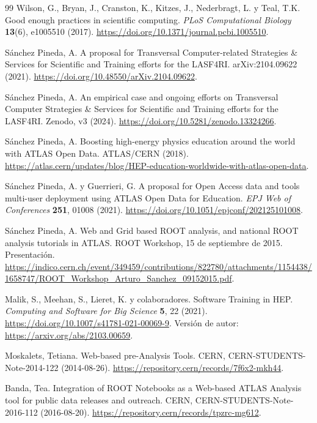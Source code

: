 \begin{thebibliography}{99}\small\setlength{\itemsep}{1pt}\setlength{\parskip}{0pt}
 Wilson, G., Bryan, J., Cranston, K., Kitzes, J., Nederbragt, L. y Teal, T.K. Good enough practices in scientific computing. \emph{PLoS Computational Biology} \textbf{13}(6), e1005510 (2017). \url{https://doi.org/10.1371/journal.pcbi.1005510}.

 Sánchez Pineda, A. A proposal for Transversal Computer-related Strategies \& Services for Scientific and Training efforts for the LASF4RI. arXiv:2104.09622 (2021). \url{https://doi.org/10.48550/arXiv.2104.09622}.

 Sánchez Pineda, A. An empirical case and ongoing efforts on Transversal Computer Strategies \& Services for Scientific and Training efforts for the LASF4RI. Zenodo, v3 (2024). \url{https://doi.org/10.5281/zenodo.13324266}.

 Sánchez Pineda, A. Boosting high-energy physics education around the world with ATLAS Open Data. ATLAS/CERN (2018). \url{https://atlas.cern/updates/blog/HEP-education-worldwide-with-atlas-open-data}.

 Sánchez Pineda, A. y Guerrieri, G. A proposal for Open Access data and tools multi-user deployment using ATLAS Open Data for Education. \emph{EPJ Web of Conferences} \textbf{251}, 01008 (2021). \url{https://doi.org/10.1051/epjconf/202125101008}.

 Sánchez Pineda, A. Web and Grid based ROOT analysis, and national ROOT analysis tutorials in ATLAS. ROOT Workshop, 15 de septiembre de 2015. Presentación. \url{https://indico.cern.ch/event/349459/contributions/822780/attachments/1154438/1658747/ROOT_Workshop_Arturo_Sanchez_09152015.pdf}.

 Malik, S., Meehan, S., Lieret, K. y colaboradores. Software Training in HEP. \emph{Computing and Software for Big Science} \textbf{5}, 22 (2021). \url{https://doi.org/10.1007/s41781-021-00069-9}. Versión de autor: \url{https://arxiv.org/abs/2103.00659}.

 Moskalets, Tetiana. Web-based pre-Analysis Tools. CERN, CERN-STUDENTS-Note-2014-122 (2014-08-26). \url{https://repository.cern/records/7f6x2-mkh44}.

 Banda, Tea. Integration of ROOT Notebooks as a Web-based ATLAS Analysis tool for public data releases and outreach. CERN, CERN-STUDENTS-Note-2016-112 (2016-08-20). \url{https://repository.cern/records/tpzrc-mg612}.


\end{thebibliography}
